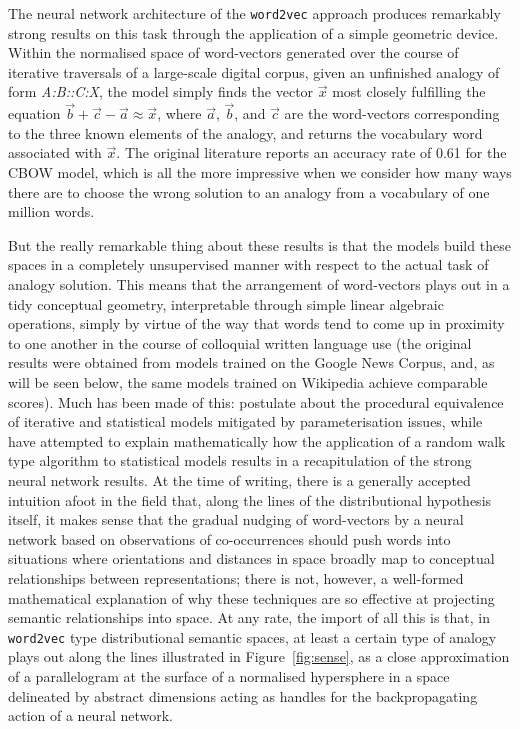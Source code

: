 The neural network architecture of the \texttt{word2vec} approach produces remarkably strong results on this task through the application of a simple geometric device.  Within the normalised space of word-vectors generated over the course of iterative traversals of a large-scale digital corpus, given an unfinished analogy of form \emph{A:B::C:X}, the model simply finds the vector $\overrightarrow{x}$ most closely fulfilling the equation $\overrightarrow{b} + \overrightarrow{c} - \overrightarrow{a} \approx \overrightarrow{x}$, where $\overrightarrow{a}$, $\overrightarrow{b}$, and $\overrightarrow{c}$ are the word-vectors corresponding to the three known elements of the analogy, and returns the vocabulary word associated with $\overrightarrow{x}$.  The original literature reports an accuracy rate of 0.61 for the CBOW model, which is all the more impressive when we consider how many ways there are to choose the wrong solution to an analogy from a vocabulary of one million words.  \citep[It should be noted that similarly strong results have been reported for the hybrid frequentist-neural model of][.]{PenningtonEA2014}

But the really remarkable thing about these results is that the models build these spaces in a completely unsupervised manner with respect to the actual task of analogy solution.  This means that the arrangement of word-vectors plays out in a tidy conceptual geometry, interpretable through simple linear algebraic operations, simply by virtue of the way that words tend to come up in proximity to one another in the course of colloquial written language use (the original results were obtained from models trained on the Google News Corpus, and, as will be seen below, the same models trained on Wikipedia achieve comparable scores).  Much has been made of this: \cite{LevyEA2014} postulate about the procedural equivalence of iterative and statistical models mitigated by parameterisation issues, while \cite{AroraEA2015} have attempted to explain mathematically how the application of a random walk type algorithm to statistical models results in a recapitulation of the strong neural network results.  At the time of writing, there is a generally accepted intuition afoot in the field that, along the lines of the distributional hypothesis itself, it makes sense that the gradual nudging of word-vectors by a neural network based on observations of co-occurrences should push words into situations where orientations and distances in space broadly map to conceptual relationships between representations; there is not, however, a well-formed mathematical explanation of why these techniques are so effective at projecting semantic relationships into space.  At any rate, the import of all this is that, in \texttt{word2vec} type distributional semantic spaces, at least a certain type of analogy plays out along the lines illustrated in Figure~\ref{fig:sense}, as a close approximation of a parallelogram at the surface of a normalised hypersphere in a space delineated by abstract dimensions acting as handles for the backpropagating action of a neural network.

